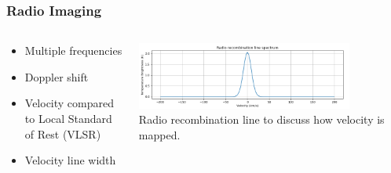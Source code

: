 \documentclass[aspectratio=169,compress]{beamer}
\newcommand\teeny{\fontsize{3pt}{3.6pt}\selectfont}
\begin{document}
\begin{frame}
  \frametitle{Radio Imaging}
  \begin{columns}
    \begin{column}{0.5\textwidth}
      \begin{itemize}
        \item Multiple frequencies
        \item Doppler shift
        \item Velocity compared to Local Standard of Rest (VLSR)
        \item Velocity line width
      \end{itemize}
    \end{column}
    \begin{column}{0.5\textwidth}
      \includegraphics[width=0.8\textwidth]{figures/rrlspectrum.png}
      {\teeny\\ Radio recombination line to discuss how velocity is mapped.}
    \end{column}
  \end{columns}
\end{frame}
\end{document}
